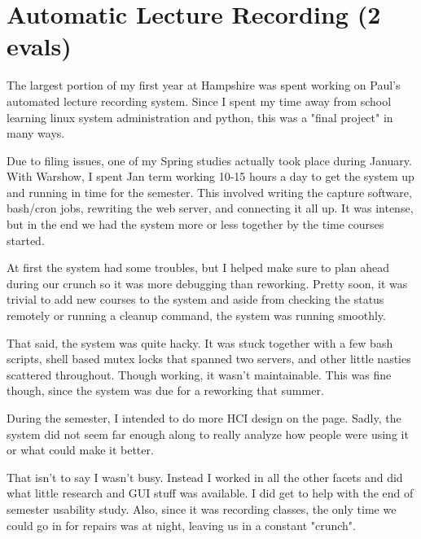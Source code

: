 \section{Automatic Lecture Recording (2 evals)}

\begin{meta}
\end{meta}

\courseself
The largest portion of my first year at Hampshire was spent working on
Paul's automated lecture recording system. Since I spent my time away
from school learning linux system administration and python, this was a
"final project" in many ways.

Due to filing issues, one of my Spring studies actually took place
during January. With Warshow, I spent Jan term working 10-15 hours a day
to get the system up and running in time for the semester. This involved
writing the capture software, bash/cron jobs, rewriting the web server,
and connecting it all up. It was intense, but in the end we had the
system more or less together by the time courses started.

At first the system had some troubles, but I helped make sure to plan
ahead during our crunch so it was more debugging than reworking. Pretty
soon, it was trivial to add new courses to the system and aside from
checking the status remotely or running a cleanup command, the system
was running smoothly.

That said, the system was quite hacky. It was stuck together with a few
bash scripts, shell based mutex locks that spanned two servers, and
other little nasties scattered throughout. Though working, it wasn't
maintainable. This was fine though, since the system was due for a
reworking that summer.

During the semester, I intended to do more HCI design on the page.
Sadly, the system did not seem far enough along to really analyze how
people were using it or what could make it better.

That isn't to say I wasn't busy. Instead I worked in all the other
facets and did what little research and GUI stuff was available. I did
get to help with the end of semester usability study. Also, since it
was recording classes, the only time we could go in for repairs was at
night, leaving us in a constant "crunch".

